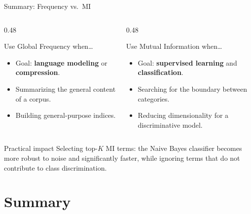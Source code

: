 \begin{frame}{Summary: Frequency vs.\ MI}
  \begin{columns}[T]
    \begin{column}{0.48\textwidth}
      \begin{block}{Use Global Frequency when…}
        \begin{itemize}
          \item Goal: \textbf{language modeling} or \textbf{compression}.
          \item Summarizing the general content of a corpus.
          \item Building general-purpose indices.
        \end{itemize}
      \end{block}
    \end{column}
    \begin{column}{0.48\textwidth}
      \begin{alertblock}{Use Mutual Information when…}
        \begin{itemize}
          \item Goal: \textbf{supervised learning} and \textbf{classification}.
          \item Searching for the boundary between categories.
          \item Reducing dimensionality for a discriminative model.
        \end{itemize}
      \end{alertblock}
    \end{column}
  \end{columns}

  \vspace{6mm}
  \begin{exampleblock}{Practical impact}
    Selecting top-$K$ MI terms: the Naive Bayes classifier becomes more robust to noise and
    significantly faster, while ignoring terms that do not contribute to class discrimination.
  \end{exampleblock}
\end{frame}

\section{Summary}

